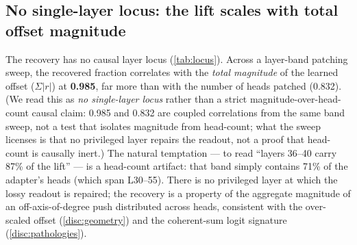 \subsection{No single-layer locus: the lift scales with total offset magnitude}
\label{disc:locus}

The recovery has no causal layer locus (\cref{tab:locus}). Across a layer-band
patching sweep, the
recovered fraction correlates with the \emph{total magnitude} of the learned offset
($\Sigma|r|$) at \textbf{0.985}, far more than with the number of heads patched
(0.832). (We read this as \emph{no single-layer locus} rather than a strict
magnitude-over-head-count causal claim: 0.985 and 0.832 are coupled correlations
from the same band sweep, not a test that isolates magnitude from head-count; what
the sweep licenses is that no privileged layer repairs the readout, not a proof
that head-count is causally inert.) The natural temptation --- to read ``layers
36--40 carry 87\% of the lift'' --- is a head-count artifact: that band simply
contains 71\% of the adapter's heads (which span L30--55). There is no privileged
layer at which the lossy readout is repaired; the recovery is a property of the
aggregate magnitude of an off-axis-of-degree push distributed across heads,
consistent with the over-scaled offset (\cref{disc:geometry}) and the coherent-sum
logit signature (\cref{disc:pathologies}).

